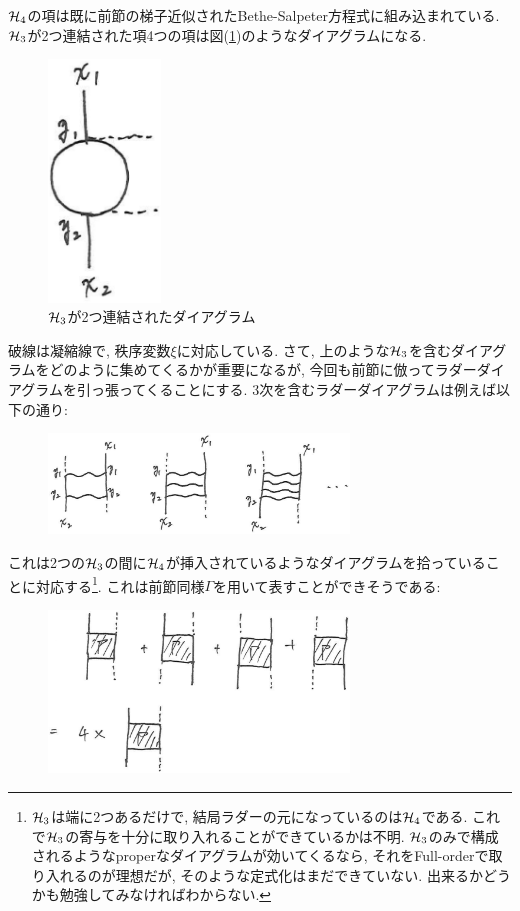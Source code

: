 \documentclass[10.5pt,a4paper]{jreport}
\begin{document}
${\cal H}_4$の項は既に前節の梯子近似されたBethe-Salpeter方程式に組み込まれている. ${\cal H}_3$が2つ連結された項4つの項は図(\ref{ladder3-5})のようなダイアグラムになる. 
\begin{figure}[H]
  \begin{center}
    \includegraphics[width = 3cm]{./EPS/ladder3-5.eps}
  \end{center}
  \caption{${\cal H}_3$が2つ連結されたダイアグラム}\label{ladder3-5}
\end{figure}
破線は凝縮線で, 秩序変数$\xi$に対応している. さて, 上のような${\cal H}_3$を含むダイアグラムをどのように集めてくるかが重要になるが, 今回も前節に倣ってラダーダイアグラムを引っ張ってくることにする. 3次を含むラダーダイアグラムは例えば以下の通り:
\begin{figure}[H]
  \begin{center}
    \includegraphics[width = 8cm]{./EPS/ladder3-1.eps}
  \end{center}
\end{figure}
これは2つの${\cal H}_3$の間に${\cal H}_4$が挿入されているようなダイアグラムを拾っていることに対応する\footnote{${\cal H}_3$は端に2つあるだけで, 結局ラダーの元になっているのは${\cal H}_4$である. これで${\cal H}_3$の寄与を十分に取り入れることができているかは不明. ${\cal H}_3$のみで構成されるようなproperなダイアグラムが効いてくるなら, それをFull-orderで取り入れるのが理想だが, そのような定式化はまだできていない. 出来るかどうかも勉強してみなければわからない. }. これは前節同様$\Gamma$を用いて表すことができそうである:
\begin{figure}[H]
  \begin{center}
    \includegraphics[width = 8cm]{./EPS/ladder3-2.eps}
  \end{center}
\end{figure}
\end{document}
